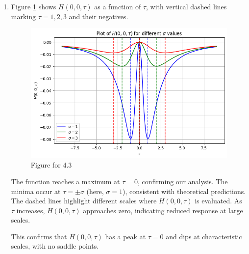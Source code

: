 \documentclass[12pt]{article}
\begin{document}
\begin{enumerate}[label=\roman*., leftmargin=1cm]
    \item
Figure \ref{fig:4.3} shows \( H(0,0,\tau) \) as a function of \( \tau \), with vertical dashed lines marking \( \tau = 1,2,3 \) and their negatives.

    \FloatBarrier

\begin{figure}[ht]
    \centering
    \includegraphics[width=0.7\columnwidth, keepaspectratio]{pics/a5-4.3.png}
    \caption[]{Figure for 4.3}
    \label{fig:4.3}
\end{figure}

\FloatBarrier

The function reaches a maximum at \( \tau = 0 \), confirming our analysis. The minima occur at \( \tau = \pm\sigma \) (here, \( \sigma = 1 \)), consistent with theoretical predictions. The dashed lines highlight different scales where \( H(0,0,\tau) \) is evaluated. As \( \tau \) increases, \( H(0,0,\tau) \) approaches zero, indicating reduced response at large scales.

This confirms that \( H(0,0,\tau) \) has a peak at \( \tau = 0 \) and dips at characteristic scales, with no saddle points.
\end{enumerate}
\end{document}
